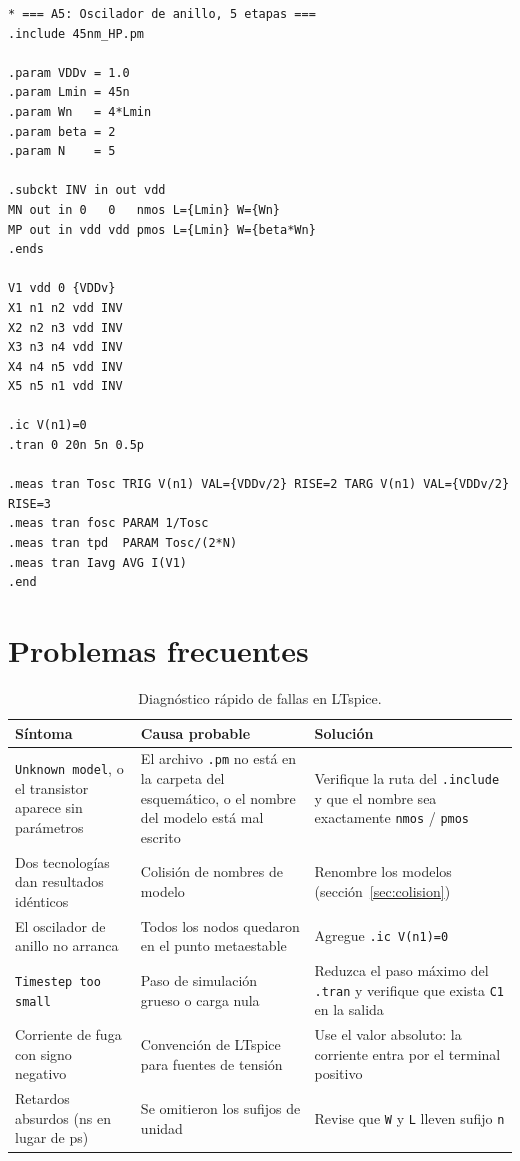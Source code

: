 \documentclass[11pt,a4paper]{article}
\begin{document}
\begin{lstlisting}
* === A5: Oscilador de anillo, 5 etapas ===
.include 45nm_HP.pm

.param VDDv = 1.0
.param Lmin = 45n
.param Wn   = 4*Lmin
.param beta = 2
.param N    = 5

.subckt INV in out vdd
MN out in 0   0   nmos L={Lmin} W={Wn}
MP out in vdd vdd pmos L={Lmin} W={beta*Wn}
.ends

V1 vdd 0 {VDDv}
X1 n1 n2 vdd INV
X2 n2 n3 vdd INV
X3 n3 n4 vdd INV
X4 n4 n5 vdd INV
X5 n5 n1 vdd INV

.ic V(n1)=0
.tran 0 20n 5n 0.5p

.meas tran Tosc TRIG V(n1) VAL={VDDv/2} RISE=2 TARG V(n1) VAL={VDDv/2} RISE=3
.meas tran fosc PARAM 1/Tosc
.meas tran tpd  PARAM Tosc/(2*N)
.meas tran Iavg AVG I(V1)
.end
\end{lstlisting}

\section{Problemas frecuentes}

\begin{table}[htbp]
\centering\small
\caption{Diagnóstico rápido de fallas en LTspice.}
\begin{tabularx}{\textwidth}{@{}p{4.3cm}XX@{}}
\toprule
\textbf{Síntoma} & \textbf{Causa probable} & \textbf{Solución} \\
\midrule
\texttt{Unknown model}, o el transistor aparece sin parámetros
& El archivo \texttt{.pm} no está en la carpeta del esquemático, o el nombre del modelo está mal escrito
& Verifique la ruta del \texttt{.include} y que el nombre sea exactamente \texttt{nmos} / \texttt{pmos} \\
Dos tecnologías dan resultados idénticos
& Colisión de nombres de modelo
& Renombre los modelos (sección~\ref{sec:colision}) \\
El oscilador de anillo no arranca
& Todos los nodos quedaron en el punto metaestable
& Agregue \texttt{.ic V(n1)=0} \\
\texttt{Timestep too small}
& Paso de simulación grueso o carga nula
& Reduzca el paso máximo del \texttt{.tran} y verifique que exista \texttt{C1} en la salida \\
Corriente de fuga con signo negativo
& Convención de LTspice para fuentes de tensión
& Use el valor absoluto: la corriente entra por el terminal positivo \\
Retardos absurdos (ns en lugar de ps)
& Se omitieron los sufijos de unidad
& Revise que \texttt{W} y \texttt{L} lleven sufijo \texttt{n} \\
\bottomrule
\end{tabularx}
\end{table}
\end{document}
